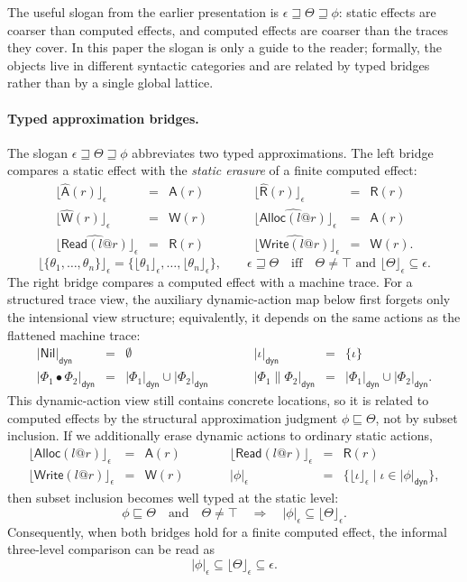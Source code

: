 \documentclass[10pt,a4paper]{article}
\makeatletter
\newcommand{\approxx}{\mathrel{\sqsubseteq}}          %
\newcommand{\Read}{\mathsf{Read}}
\newcommand{\Write}{\mathsf{Write}}
\newcommand{\Alloc}{\mathsf{Alloc}}
\newcommand{\Rs}{\mathsf{R}}
\newcommand{\Ws}{\mathsf{W}}
\newcommand{\As}{\mathsf{A}}
\newcommand{\Rhat}{\widehat{\mathsf{R}}}
\newcommand{\What}{\widehat{\mathsf{W}}}
\newcommand{\Ahat}{\widehat{\mathsf{A}}}
\newcommand{\Nil}{\mathsf{Nil}}
\newcommand{\tracecat}{\mathbin{\bullet}}
\newcommand{\at}{\mathord{@}}
\newcommand{\dynset}[1]{\lvert #1\rvert_{\mathsf{dyn}}}
\newcommand{\staticset}[1]{\lvert #1\rvert_{\epsilon}}
\newcommand{\cerase}[1]{\lfloor #1 \rfloor_{\epsilon}}
\newcommand{\covers}{\mathrel{\sqsupseteq}}
\makeatother
\begin{document}
The useful slogan from the earlier presentation is
$\epsilon\covers\Theta\covers\phi$: static effects are coarser than computed
effects, and computed effects are coarser than the traces they cover.  In
this paper the slogan is only a guide to the reader; formally, the objects live
in different syntactic categories and are related by typed bridges rather than
by a single global lattice.


\paragraph{Typed approximation bridges.}
The slogan $\epsilon\covers\Theta\covers\phi$ abbreviates two typed
approximations.  The left bridge compares a static effect with the
\emph{static erasure} of a finite computed effect:
\[
\begin{array}{rclcrcl}
\cerase{\Ahat(r)} &=& \As(r)
&\qquad&
\cerase{\Rhat(r)} &=& \Rs(r)\\[0.5mm]
\cerase{\What(r)} &=& \Ws(r)
&\qquad&
\cerase{\widehat{\Alloc(l\at r)}} &=& \As(r)\\[0.5mm]
\cerase{\widehat{\Read(l\at r)}} &=& \Rs(r)
&\qquad&
\cerase{\widehat{\Write(l\at r)}} &=& \Ws(r).
\end{array}
\]
\[
\cerase{\{\theta_1,\ldots,\theta_n\}}
  = \{\cerase{\theta_1},\ldots,\cerase{\theta_n}\},
\qquad
\epsilon\covers\Theta
\quad\text{iff}\quad
\Theta\neq\top\text{ and }\cerase{\Theta}\subseteq\epsilon.
\]
The right bridge compares a computed effect with a machine trace. For a
structured trace view, the auxiliary dynamic-action map below first forgets only
the intensional view structure; equivalently, it depends on the same actions as
the flattened machine trace:
\[
\begin{array}{rclcrcl}
\dynset{\Nil} &=& \emptyset
&\qquad&
\dynset{\iota} &=& \{\iota\}\\[0.5mm]
\dynset{\Phi_1\tracecat\Phi_2} &=&
  \dynset{\Phi_1}\cup\dynset{\Phi_2}
&\qquad&
\dynset{\Phi_1\parallel\Phi_2} &=&
  \dynset{\Phi_1}\cup\dynset{\Phi_2}.
\end{array}
\]
This dynamic-action view still contains concrete locations, so it is
related to computed effects by the structural approximation judgment
$\phi\approxx\Theta$, not by subset inclusion.  If we additionally erase
dynamic actions to ordinary static actions,
\[
\begin{array}{rclcrcl}
\cerase{\Alloc(l\at r)} &=& \As(r)
&\qquad&
\cerase{\Read(l\at r)} &=& \Rs(r)\\[0.5mm]
\cerase{\Write(l\at r)} &=& \Ws(r)
&\qquad&
\staticset{\phi} &=& \{\cerase{\iota}\mid \iota\in\dynset{\phi}\},
\end{array}
\]
then subset inclusion becomes well typed at the static level:
\[
\phi\approxx\Theta\quad\text{and}\quad\Theta\neq\top
\quad\Longrightarrow\quad
\staticset{\phi}\subseteq\cerase{\Theta}.
\]
Consequently, when both bridges hold for a finite computed effect, the informal
three-level comparison can be read as
\[
\staticset{\phi}\subseteq\cerase{\Theta}\subseteq\epsilon.
\]
\end{document}
